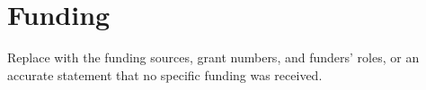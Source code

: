 \section*{Funding}
Replace with the funding sources, grant numbers, and funders' roles, or
an accurate statement that no specific funding was received.
